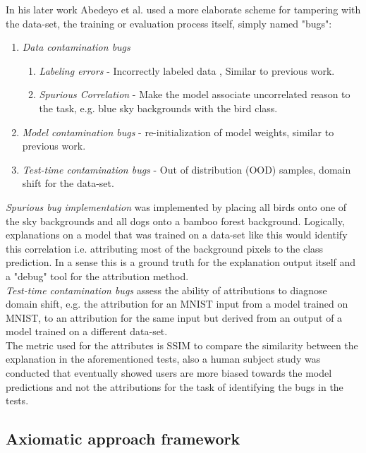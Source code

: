 \documentclass[12pt]{report}
\begin{document}
In his later work Abedeyo et al. \cite{DBLP:journals/corr/abs-2011-05429} used a more elaborate scheme for tampering with the data-set, the training or evaluation process itself, simply named "bugs":
\begin{enumerate}
	\item \textit{Data contamination bugs} 
	\begin{enumerate}
		\item \textit{Labeling errors} - Incorrectly labeled data , Similar to previous work.
		\item \textit{Spurious Correlation} - Make the model associate uncorrelated reason to the task, e.g. blue sky backgrounds with the bird class. 
	\end{enumerate}
	\item \textit{Model contamination bugs} - re-initialization of model weights, similar to previous work.
	\item \textit{Test-time contamination bugs} - Out of distribution (OOD) samples, domain shift for the data-set. 
\end{enumerate}

\textit{Spurious bug implementation} was implemented by placing all birds onto one of the sky backgrounds and all dogs onto a bamboo forest background. Logically, explanations on a model that was trained on a data-set like this would identify this correlation i.e. attributing most of the background pixels to the class prediction. In a sense this is a ground truth for the explanation output itself and a "debug" tool for the attribution method.\\

\textit{Test-time contamination bugs} assess the ability of attributions to diagnose domain shift, e.g. the attribution for an MNIST input from a model trained on MNIST, to an attribution for the same input but derived from an output of a model trained on a different data-set. \\


The metric used for the attributes is SSIM to compare the similarity between the explanation in the aforementioned tests, also a human subject study was conducted that eventually showed users are more biased towards the model predictions and not the attributions for the task of identifying the bugs in the tests.
\newpage
\subsection{Axiomatic approach framework}
\end{document}
